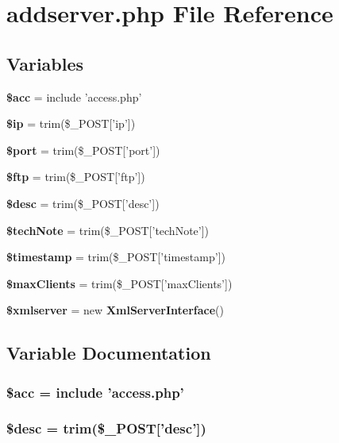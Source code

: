 \section{addserver.php File Reference}
\label{addserver_8php}


\subsection*{Variables}
\begin{CompactItemize}
\item 
{\bf \$acc} = include 'access.php'
\item 
{\bf \$ip} = trim(\$\_\-POST['ip'])
\item 
{\bf \$port} = trim(\$\_\-POST['port'])
\item 
{\bf \$ftp} = trim(\$\_\-POST['ftp'])
\item 
{\bf \$desc} = trim(\$\_\-POST['desc'])
\item 
{\bf \$tech\-Note} = trim(\$\_\-POST['tech\-Note'])
\item 
{\bf \$timestamp} = trim(\$\_\-POST['timestamp'])
\item 
{\bf \$max\-Clients} = trim(\$\_\-POST['max\-Clients'])
\item 
{\bf \$xmlserver} = new {\bf Xml\-Server\-Interface}()
\end{CompactItemize}


\subsection{Variable Documentation}
\subsubsection{\setlength{\rightskip}{0pt plus 5cm}\$acc = include 'access.php'}\label{addserver_8php_542926c588a05eb69553d79c83cf73da}


\subsubsection{\setlength{\rightskip}{0pt plus 5cm}\$desc = trim(\$\_\-POST['desc'])}\label{addserver_8php_31059b9e4d0c5af34df20da32232ea9a}


